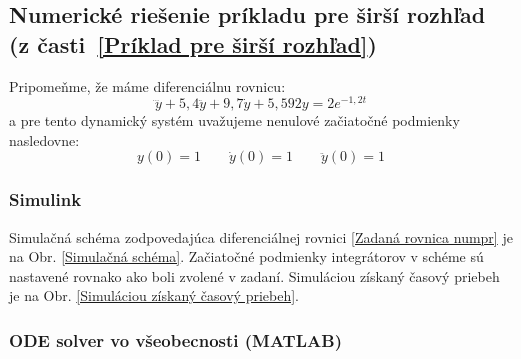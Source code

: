\documentclass[a4paper, 10pt, ]{article}
\begin{document}
\subsection{Numerické riešenie príkladu pre širší rozhľad (z časti~\ref{Príklad pre širší rozhľad})}

Pripomeňme, že máme diferenciálnu rovnicu:
\begin{equation} \label{Zadaná rovnica numpr}
	\dddot{y} + 5,4 \ddot{y} + 9,7 \dot{y} + 5,592 y = 2 e^{-1,2t}
\end{equation}
a pre tento dynamický systém uvažujeme nenulové začiatočné podmienky nasledovne:
\begin{equation*}
		y(0) = 1 \qquad \dot{y}(0)  = 1 \qquad 	\ddot{y}(0) = 1
\end{equation*}




\subsubsection{Simulink}

Simulačná schéma zodpovedajúca diferenciálnej rovnici \eqref{Zadaná rovnica numpr} je na Obr. \ref{Simulačná schéma}. Začiatočné podmienky integrátorov v schéme sú nastavené rovnako ako boli zvolené v zadaní. Simuláciou získaný časový priebeh je na Obr. \ref{Simuláciou získaný časový priebeh}.

\begin{center}


	\label{Simulačná schéma}

\end{center}

\begin{center}


	\label{Simuláciou získaný časový priebeh}

\end{center}




\subsubsection{ODE solver vo všeobecnosti (MATLAB)}
\end{document}
